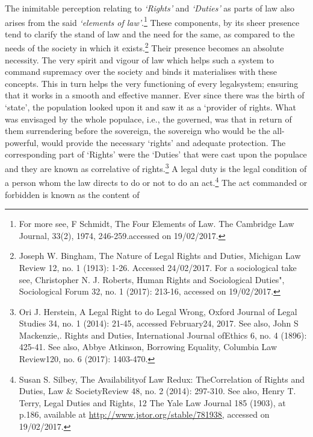 \begin{multicols}{2}

\noi
The inimitable perception relating to \textit{‘Rights’} and \textit{‘Duties’} as parts of law also arises from the said \textit{‘elements of law’}.\footnote{For more see, F Schmidt, The Four Elements of Law. The Cambridge Law Journal, 33(2), 1974, 246-259.accessed on 19/02/2017.} These components, by its sheer presence tend to clarify the stand of law and the need for the same, as compared to the needs of the society in which it exists.\footnote{Joseph W. Bingham, The Nature of Legal Rights and Duties, Michigan Law Review 12, no. 1 (1913): 1-26. Accessed 24/02/2017. For a sociological take see, Christopher N. J. Roberts, Human Rights and Sociological Duties", Sociological Forum 32, no. 1 (2017): 213-16, accessed on 19/02/2017.} Their presence becomes an absolute necessity. The very spirit and vigour of law which helps such a system to command supremacy over the society and binds it materialises with these concepts. This in turn helps the very functioning of every legalsystem; ensuring that it works in a smooth
and effective manner. Ever since there was the birth of ‘state’, the population looked upon it
and saw it as a ‘provider of rights. What was envisaged by the whole populace, i.e., the
governed, was that in return of them surrendering before the sovereign, the sovereign who
would be the all-powerful, would provide the necessary ‘rights’ and adequate protection. The
corresponding part of ‘Rights’ were the ‘Duties’ that were cast upon the populace and they are
known as correlative of rights.\footnote{Ori J. Herstein, A Legal Right to do Legal Wrong, Oxford Journal of Legal Studies 34, no. 1 (2014): 21-45, accessed February24, 2017. See also, John S Mackenzie,. Rights and Duties, International Journal ofEthics 6, no. 4 (1896): 425-41. See also, Abbye Atkinson, Borrowing Equality, Columbia Law Review120, no. 6 (2017): 1403-470.} A legal duty is the legal condition of a person whom the law
directs to do or not to do an act.\footnote{Susan S. Silbey, The Availabilityof Law Redux: TheCorrelation of Rights and Duties, Law \& SocietyReview 48, no. 2 (2014): 297-310. See also, Henry T. Terry, Legal Duties and Rights, 12 The Yale Law Journal 185 (1903), at p.186, available at \url{http://www.jstor.org/stable/781938,} accessed on 19/02/2017.} The act commanded or forbidden is known as the content of

\end{multicols}
